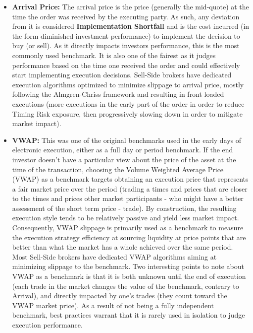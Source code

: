 \begin{itemize}
\item \textbf{Arrival Price:} The arrival price is the price (generally the mid-quote) at the time the order was received by the executing party. As such, any deviation from it is considered \textbf{Implementation Shortfall} and is the cost incurred (in the form diminished investment performance) to implement the decision to buy (or sell). As it directly impacts investors performance, this is the most commonly used benchmark. It is also one of the fairest as it judges performance based on the time one received the order and could effectively start implementing execution decisions. Sell-Side brokers have dedicated execution algorithms optimized to minimize slippage to arrival price, mostly following the Almgren-Chriss framework and resulting in front loaded executions (more executions in the early part of the order in order to reduce Timing Risk exposure, then progressively slowing down in order to mitigate market impact).

\item \textbf{VWAP:} This was one of the original benchmarks used in the early days of electronic execution, either as a full day or period benchmark. If the end investor doesn't have a particular view about the price of the asset at the time of the transaction, choosing the Volume Weighted Average Price (VWAP) as a benchmark targets obtaining an execution price that represents a fair market price over the period (trading a times and prices that are closer to the times and prices other market participants - who might have a better assessment of the short term price - trade). By construction, the resulting execution style tends to be relatively passive and yield  less market impact. Consequently, VWAP slippage is primarily used as a benchmark to measure the execution strategy efficiency at sourcing liquidity at price points that are better than what the market has a whole achieved over the same period.
Most Sell-Side brokers have dedicated VWAP algorithms aiming at minimizing slippage to the benchmark. Two interesting points to note about VWAP as a benchmark is that it is both unknown until the end of execution (each trade in the market changes the value of the benchmark, contrary to Arrival), and directly impacted by one's trades (they count toward the VWAP market price). As a result of not being a fully independent benchmark, best practices warrant that it is rarely used in isolation to judge execution performance.


\end{itemize}
